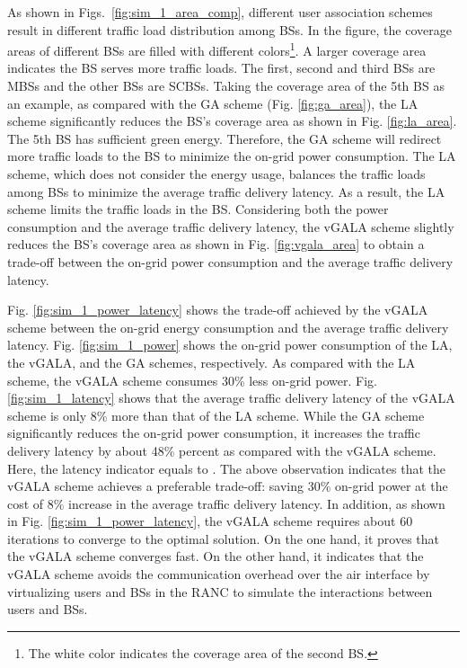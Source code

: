 \documentclass[journal]{IEEEtran}
\theoremstyle{definition}
\begin{document}
As shown in Figs.~\ref{fig:sim_1_area_comp}, different user association schemes result in different traffic load distribution among BSs. In the figure, the coverage areas of different BSs are filled with different colors\footnote{The white color indicates the coverage area of the second BS.}. A larger coverage area indicates the BS serves more traffic loads. The first, second and third BSs are MBSs and the other BSs are SCBSs. Taking the coverage area of the 5th BS as an example, as compared with the GA scheme (Fig. \ref{fig:ga_area}), the LA scheme significantly reduces the BS's coverage area as shown in Fig. \ref{fig:la_area}. The 5th BS has sufficient green energy. Therefore, the GA scheme will redirect more traffic loads to the BS to minimize the on-grid power consumption. The LA scheme, which does not consider the energy usage, balances the traffic loads among BSs to minimize the average traffic delivery latency. As a result, the LA scheme limits the traffic loads in the BS. Considering both the power consumption and the average traffic delivery latency, the vGALA scheme slightly reduces the BS's coverage area as shown in Fig. \ref{fig:vgala_area} to obtain a trade-off between the on-grid power consumption and the average traffic delivery latency.

Fig. \ref{fig:sim_1_power_latency} shows the trade-off achieved by the vGALA scheme between the on-grid energy consumption and the average traffic delivery latency. Fig. \ref{fig:sim_1_power} shows the on-grid power consumption of the LA, the vGALA, and the GA schemes, respectively. As compared with the LA scheme, the vGALA scheme consumes 30\% less on-grid power. Fig. \ref{fig:sim_1_latency} shows that the average traffic delivery latency of the vGALA scheme is only 8\% more than that of the LA scheme. While the GA scheme significantly reduces the on-grid power consumption, it increases the traffic delivery latency by about 48\% percent as compared with the vGALA scheme. Here, the latency indicator equals to . The above observation indicates that the vGALA scheme achieves a preferable trade-off: saving 30\% on-grid power at the cost of 8\% increase in the average traffic delivery latency. In addition, as shown in Fig. \ref{fig:sim_1_power_latency}, the vGALA scheme requires about 60 iterations to converge to the optimal solution. On the one hand, it proves that the vGALA scheme converges fast. On the other hand, it indicates that the vGALA scheme avoids the communication overhead over the air interface by virtualizing users and BSs in the RANC to simulate the interactions between users and BSs.
\end{document}
